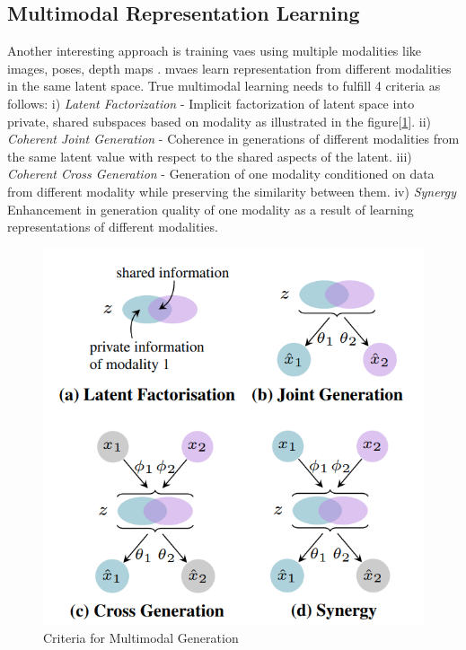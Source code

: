 \subsection{Multimodal Representation Learning}

\label{section:multimodal_representation_learning}

Another interesting approach is training \ac{vae}s using multiple
modalities like images, poses, depth maps \cite{CrossingNets, crossmodal,
    MMVAE,HandDisentangled}. \ac{mvae}s learn representation from different
modalities in the same latent space. True multimodal learning needs to
fulfill 4 criteria as follows: i) \textit{Latent Factorization} - Implicit
factorization of latent space into private, shared subspaces based on
modality as illustrated in the figure[\ref{fig:criteria}]. ii) \textit
{Coherent Joint Generation} - Coherence in generations of different
modalities from the same latent value with respect to the shared aspects of
the latent. iii) \textit{Coherent Cross Generation} - Generation of one
modality conditioned on data from different modality while preserving the
similarity between them. iv) \textit{Synergy} Enhancement in generation
quality of one modality as a result of learning representations of
different modalities.

\begin{figure}[!h]

    \centering

    \includegraphics[scale=0.4]{figures/criteria.png}

    \caption{Criteria for Multimodal Generation \cite{MMVAE}}

    \label{fig:criteria}

\end{figure}

